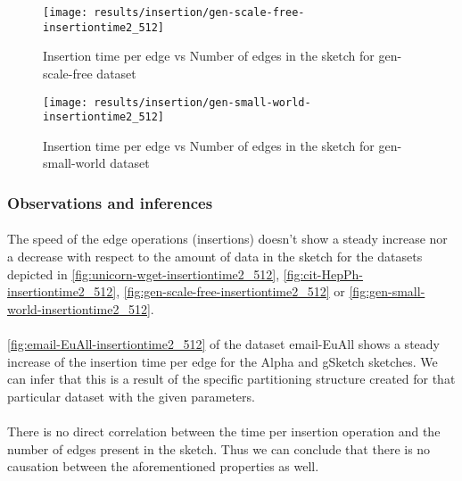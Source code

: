 \begin{figure}[H]
    \centering \texttt{[image: results/insertion/gen-scale-free-insertiontime2\_512]}
    \vspace{-0.5cm}
    \caption{Insertion time per edge vs Number of edges in the sketch for gen-scale-free dataset}
    \label{fig:gen-scale-free-insertiontime2_512}
\end{figure}

\begin{figure}[H]
    \centering \texttt{[image: results/insertion/gen-small-world-insertiontime2\_512]}
    \vspace{-0.5cm}
    \caption{Insertion time per edge vs Number of edges in the sketch for gen-small-world dataset}
    \label{fig:gen-small-world-insertiontime2_512}
\end{figure}

\subsubsection{Observations and inferences}

\paragraph{}
The speed of the edge operations (insertions) doesn't show a steady increase nor a decrease with respect to the amount of data in the sketch for the datasets depicted in \autoref{fig:unicorn-wget-insertiontime2_512}, \autoref{fig:cit-HepPh-insertiontime2_512}, \autoref{fig:gen-scale-free-insertiontime2_512} or \autoref{fig:gen-small-world-insertiontime2_512}.

\paragraph{}
\autoref{fig:email-EuAll-insertiontime2_512} of the dataset email-EuAll shows a steady increase of the insertion time per edge for the Alpha and gSketch sketches. We can infer that this is a result of the specific partitioning structure created for that particular dataset with the given parameters.

\paragraph{}
There is no direct correlation between the time per insertion operation and the number of edges present in the sketch. Thus we can conclude that there is no causation between the aforementioned properties as well.